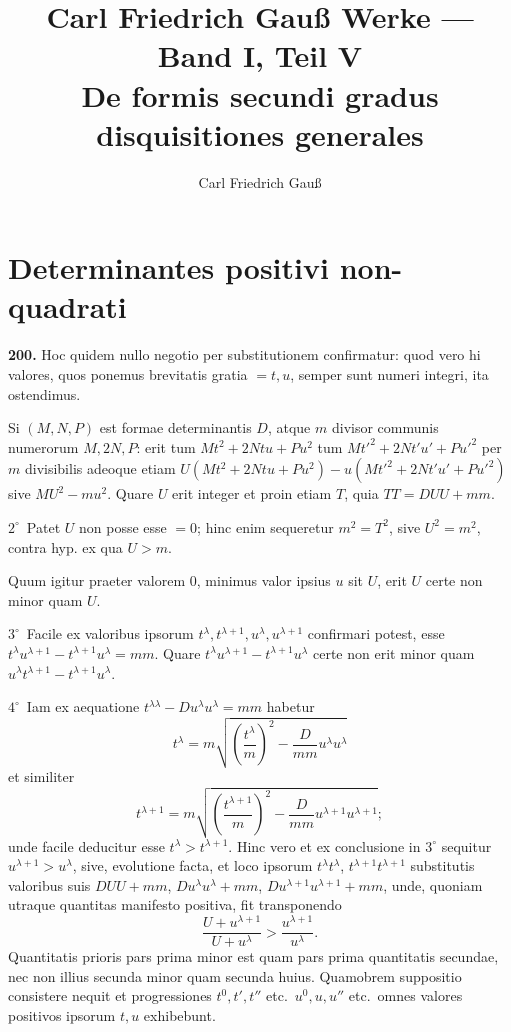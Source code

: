 \documentclass[12pt,a4paper]{article}
\title{\textbf{Carl Friedrich Gau\ss{} Werke --- Band I, Teil V}\\[0.5em]
\large De formis secundi gradus disquisitiones generales}
\author{Carl Friedrich Gau\ss{}}
\date{}
\theoremstyle{plain}
\theoremstyle{definition}
\theoremstyle{remark}
\begin{document}
\maketitle
\thispagestyle{empty}

\section*{Determinantes positivi non-quadrati}

\textbf{200.}
Hoc quidem nullo negotio per substitutionem confirmatur: quod vero hi valores, quos ponemus brevitatis gratia $=t,u$, semper sunt numeri integri, ita ostendimus.

Si $(M,N,P)$ est formae determinantis $D$, atque $m$ divisor communis numerorum $M,2N,P$: erit tum $Mt^2+2Ntu+Pu^2$ tum $Mt'^2+2Nt'u'+Pu'^2$ per $m$ divisibilis adeoque etiam $U(Mt^2+2Ntu+Pu^2)-u(Mt'^2+2Nt'u'+Pu'^2)$ sive $MU^2-mu^2$. Quare $U$ erit integer et proin etiam $T$, quia $TT=DUU+mm$.

$2^\circ$~Patet $U$ non posse esse $=0$; hinc enim sequeretur $m^2=T^2$, sive $U^2=m^2$, contra hyp. ex qua $U>m$.

Quum igitur praeter valorem $0$, minimus valor ipsius $u$ sit $U$, erit $U$ certe non minor quam $U$.

$3^\circ$~Facile ex valoribus ipsorum $t^\lambda,t^{\lambda+1},u^\lambda,u^{\lambda+1}$ confirmari potest, esse $t^\lambda u^{\lambda+1}-t^{\lambda+1}u^\lambda=mm$. Quare $t^\lambda u^{\lambda+1}-t^{\lambda+1}u^\lambda$ certe non erit minor quam $u^\lambda t^{\lambda+1}-t^{\lambda+1}u^\lambda$.

$4^\circ$~Iam ex aequatione $t^{\lambda\lambda}-Du^\lambda u^\lambda=mm$ habetur
\[
t^\lambda=m\sqrt{\left(\frac{t^\lambda}{m}\right)^2-\frac{D}{mm}u^\lambda u^\lambda}
\]
et similiter
\[
t^{\lambda+1}=m\sqrt{\left(\frac{t^{\lambda+1}}{m}\right)^2-\frac{D}{mm}u^{\lambda+1}u^{\lambda+1}};
\]
unde facile deducitur esse $t^\lambda>t^{\lambda+1}$. Hinc vero et ex conclusione in $3^\circ$ sequitur $u^{\lambda+1}>u^\lambda$, sive, evolutione facta, et loco ipsorum $t^\lambda t^\lambda$, $t^{\lambda+1}t^{\lambda+1}$ substitutis valoribus suis $DUU+mm$, $Du^\lambda u^\lambda+mm$, $Du^{\lambda+1}u^{\lambda+1}+mm$, unde, quoniam utraque quantitas manifesto positiva, fit transponendo
\[
\frac{U+u^{\lambda+1}}{U+u^\lambda} > \frac{u^{\lambda+1}}{u^\lambda}.
\]
Quantitatis prioris pars prima minor est quam pars prima quantitatis secundae, nec non illius secunda minor quam secunda huius. Quamobrem suppositio consistere nequit et progressiones $t^0,t',t''$ etc.\ $u^0,u,u''$ etc.\ omnes valores positivos ipsorum $t,u$ exhibebunt.
\end{document}
